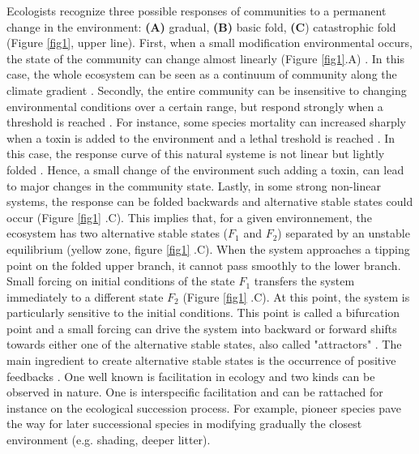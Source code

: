 Ecologists recognize three possible responses of communities to a permanent
change in the environment: \textbf{(A)} gradual, \textbf{(B)} basic fold,
\textbf{(C}) catastrophic fold \cite{Scheffer2001} (Figure \ref{fig1}, upper
line). First, when a small modification environmental occurs, the state of the
community can change almost linearly (Figure \ref{fig1}.A)
\cite{Scheffer2001,Scheffer2009}. In this case, the whole ecosystem can be
seen as a continuum of community along the climate gradient
\cite{Scheffer2001,Scheffer2009,scheffer2009critical}. Secondly, the entire
community can be insensitive to changing environmental conditions over a
certain range, but respond strongly when a threshold is reached
\cite{scheffer2009critical}. For instance, some species mortality can
increased sharply when a toxin is added to the environment and a lethal
treshold is reached \cite{scheffer2009critical}. In this case, the response
curve of this natural systeme is not linear but lightly folded . Hence, a
small change of the environment such adding a toxin, can lead to major changes
in the  community state. Lastly, in some strong non-linear systems, the
response can be folded backwards and alternative stable states could occur
(Figure \ref{fig1} .C). This implies that, for a given environnement, the
ecosystem has two alternative stable states ($F_1$ and $F_2$) separated by an
unstable equilibrium (yellow zone, figure \ref{fig1} .C). When the system
approaches a tipping point on the folded upper branch, it cannot pass smoothly
to the lower branch. Small forcing on initial conditions of the state $F_1$
transfers the system immediately to a different state $F_2$ (Figure \ref{fig1}
.C). At this point, the system is particularly sensitive to the initial
conditions. This point is called a bifurcation point and a small forcing can
drive the system into backward or forward shifts towards either one of the
alternative stable states, also called "attractors"
\cite{scheffer2009critical}. The main ingredient to create alternative stable
states is the occurrence of positive feedbacks
\cite{scheffer2009critical,Schroder2005}. One well known is facilitation in
ecology and two kinds can be observed in nature. One is interspecific
facilitation and can be rattached for instance on the ecological succession
process. For example,  pioneer species pave the way for later successional
species in modifying gradually the closest environment (e.g. shading, deeper
litter)\cite{scheffer2009critical,Levine2006}.  \\



